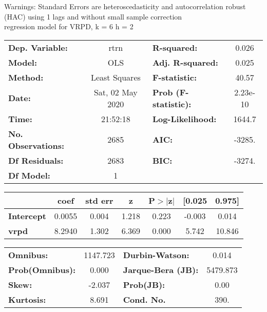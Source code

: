 Warnings: \newline
 [1] Standard Errors are heteroscedasticity and autocorrelation robust (HAC) using 1 lags and without small sample correction\\ 

regression model for VRPD, k = 6 h = 2\begin{center}
\begin{tabular}{lclc}
\toprule
\textbf{Dep. Variable:}    &       rtrn       & \textbf{  R-squared:         } &     0.026   \\
\textbf{Model:}            &       OLS        & \textbf{  Adj. R-squared:    } &     0.025   \\
\textbf{Method:}           &  Least Squares   & \textbf{  F-statistic:       } &     40.57   \\
\textbf{Date:}             & Sat, 02 May 2020 & \textbf{  Prob (F-statistic):} &  2.23e-10   \\
\textbf{Time:}             &     21:52:18     & \textbf{  Log-Likelihood:    } &    1644.7   \\
\textbf{No. Observations:} &        2685      & \textbf{  AIC:               } &    -3285.   \\
\textbf{Df Residuals:}     &        2683      & \textbf{  BIC:               } &    -3274.   \\
\textbf{Df Model:}         &           1      & \textbf{                     } &             \\
\bottomrule
\end{tabular}
\begin{tabular}{lcccccc}
                   & \textbf{coef} & \textbf{std err} & \textbf{z} & \textbf{P$> |$z$|$} & \textbf{[0.025} & \textbf{0.975]}  \\
\midrule
\textbf{Intercept} &       0.0055  &        0.004     &     1.218  &         0.223        &       -0.003    &        0.014     \\
\textbf{vrpd}      &       8.2940  &        1.302     &     6.369  &         0.000        &        5.742    &       10.846     \\
\bottomrule
\end{tabular}
\begin{tabular}{lclc}
\textbf{Omnibus:}       & 1147.723 & \textbf{  Durbin-Watson:     } &    0.014  \\
\textbf{Prob(Omnibus):} &   0.000  & \textbf{  Jarque-Bera (JB):  } & 5479.873  \\
\textbf{Skew:}          &  -2.037  & \textbf{  Prob(JB):          } &     0.00  \\
\textbf{Kurtosis:}      &   8.691  & \textbf{  Cond. No.          } &     390.  \\
\bottomrule
\end{tabular}
\end{center}

